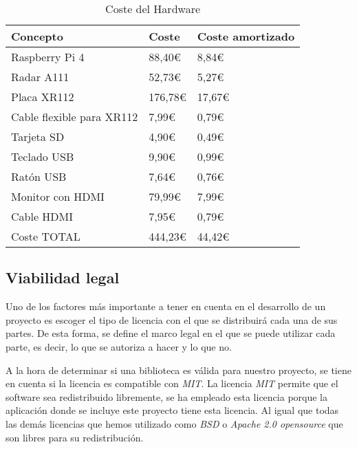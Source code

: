\begin{table}[H]
	\centering
	\begin{tabular}{l|l|l}
		\toprule
		Concepto & Coste & Coste amortizado  \\
		\midrule
		Raspberry Pi 4  & 88,40€ & 8,84€ \\
  		Radar A111 & 52,73€ & 5,27€\\
  		Placa XR112 & 176,78€ & 17,67€\\
  		Cable flexible para XR112  & 7,99€ & 0,79€\\
  		Tarjeta SD  & 4,90€ & 0,49€\\
  		Teclado USB & 9,90€ & 0,99€\\
  		Ratón USB & 7,64€ & 0,76€\\
  		Monitor con HDMI & 79,99€ & 7,99€\\
  		Cable HDMI & 7,95€  & 0,79€\\
		\bottomrule
		Coste TOTAL & 444,23€ & 44,42€\\
	\end{tabular}
	\caption{Coste del Hardware}
	\label{tab:material}
\end{table}
 
\subsection{Viabilidad legal}

Uno de los factores más importante a tener en cuenta en el desarrollo de un proyecto es escoger el tipo de licencia con el que se distribuirá cada una de sus partes. De esta forma, se define el marco legal en el que se puede utilizar cada parte, es decir, lo que se autoriza a hacer y lo que no.

A la hora de determinar si una biblioteca es válida para nuestro proyecto, se tiene en cuenta si la licencia es compatible con \textit{MIT}. La licencia \textit{MIT} permite que el software sea redistribuido libremente, se ha empleado esta licencia porque la aplicación donde se incluye este proyecto tiene esta licencia. Al igual que todas las demás licencias que hemos utilizado como \textit{BSD} o \textit{Apache 2.0 opensource} que son libres para su redistribución.

